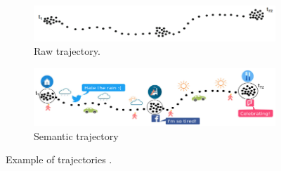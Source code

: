 \documentclass{article}
\theoremstyle{remark}
\begin{document}
\begin{figure}[!h]

\centering
\begin{subfigure}{0.5\textheight}
\centering
\includegraphics[width=0.9\linewidth]{figures/raw_trajectory_example.png} 
\caption{Raw trajectory.}
\label{fig:raw_trajectory_example}
\end{subfigure}
\begin{subfigure}{0.5\textheight}
\centering
\includegraphics[width=0.9\linewidth]{figures/semantic_trajectory_example.png}
\caption{Semantic trajectory}
\label{fig:semantic_trajectory_example}
\end{subfigure}

\caption{Example of trajectories \citep{ferrero_mastermovelets_2020}.}
\label{fig:trajectory_example}
\end{figure}
\end{document}
